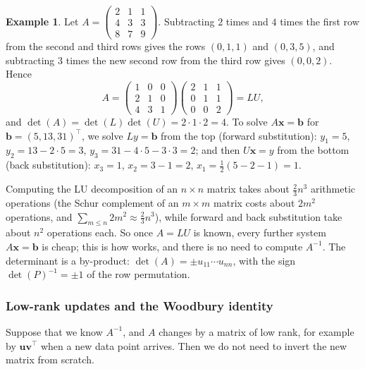 \documentclass[11pt]{article}
\newcommand{\py}[1]{\texttt{\detokenize{#1}}}
\theoremstyle{definition}
\newtheorem{example}[definition]{Example}
\theoremstyle{plain}
\theoremstyle{remark}
\begin{document}
\begin{example}\label{ex:lu}
    Let $A = \begin{pmatrix} 2 & 1 & 1 \\ 4 & 3 & 3 \\ 8 & 7 & 9 \end{pmatrix}$. Subtracting $2$ times and $4$ times the first row from the second and third rows gives the rows $(0, 1, 1)$ and $(0, 3, 5)$, and subtracting $3$ times the new second row from the third row gives $(0, 0, 2)$. Hence
    \[A = \begin{pmatrix} 1 & 0 & 0 \\ 2 & 1 & 0 \\ 4 & 3 & 1 \end{pmatrix}\begin{pmatrix} 2 & 1 & 1 \\ 0 & 1 & 1 \\ 0 & 0 & 2 \end{pmatrix} = LU,\]
    and $\det(A) = \det(L)\det(U) = 2 \cdot 1 \cdot 2 = 4$. To solve $A\mathbf{x} = \mathbf{b}$ for $\mathbf{b} = (5, 13, 31)^\top$, we solve $Ly = \mathbf{b}$ from the top (forward substitution): $y_1 = 5$, $y_2 = 13 - 2 \cdot 5 = 3$, $y_3 = 31 - 4 \cdot 5 - 3 \cdot 3 = 2$; and then $U\mathbf{x} = y$ from the bottom (back substitution): $x_3 = 1$, $x_2 = 3 - 1 = 2$, $x_1 = \frac{1}{2}(5 - 2 - 1) = 1$.
\end{example}

Computing the LU decomposition of an $n \times n$ matrix takes about $\frac{2}{3}n^3$ arithmetic operations (the Schur complement of an $m \times m$ matrix costs about $2m^2$ operations, and $\sum_{m \leq n} 2m^2 \approx \frac{2}{3}n^3$), while forward and back substitution take about $n^2$ operations each. So once $A = LU$ is known, every further system $A\mathbf{x} = \mathbf{b}$ is cheap; this is how \py{np.linalg.solve} works, and there is no need to compute $A^{-1}$. The determinant is a by-product: $\det(A) = \pm u_{11} \cdots u_{nn}$, with the sign $\det(P)^{-1} = \pm 1$ of the row permutation.

\subsubsection{Low-rank updates and the Woodbury identity}

Suppose that we know $A^{-1}$, and $A$ changes by a matrix of low rank, for example by $\mathbf{u}\mathbf{v}^\top$ when a new data point arrives. Then we do not need to invert the new matrix from scratch.
\end{document}
